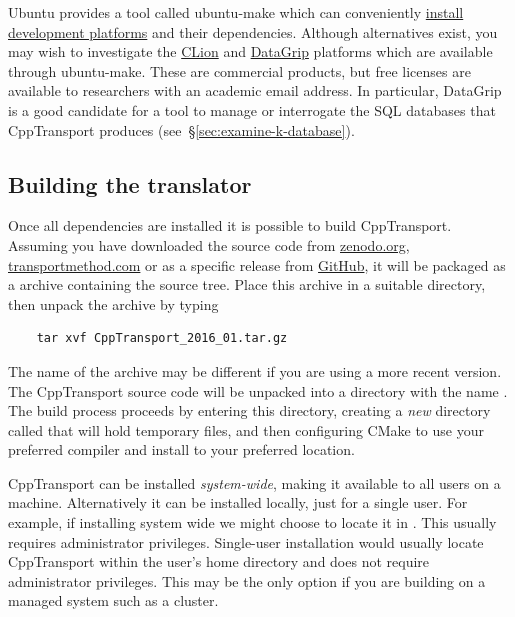 \documentclass[11pt,a4paper]{article}
\renewcommand{\texttt}[1]{{\ttfamily\fontseries{l}\selectfont{#1}}}
\newcommand{\packagefont}{\sffamily}
\newcommand{\CppTransport}{{\packagefont CppTransport}}
\newcommand{\CLion}{{\packagefont CLion}}
\newcommand{\DataGrip}{{\packagefont DataGrip}}
\newcommand{\CMake}{{\packagefont CMake}}
\newcommand{\file}[1]{\texttt{{#1}}}
\begin{document}
Ubuntu provides a tool called ubuntu-make which can conveniently
\href{https://wiki.ubuntu.com/ubuntu-make}{install
development platforms} and their dependencies.
Although alternatives exist, you may wish to investigate the
\href{https://www.jetbrains.com/clion/}{\CLion}
and
\href{https://www.jetbrains.com/datagrip/}{\DataGrip}
platforms which are available through ubuntu-make.
These are commercial products, but free licenses are available
to researchers with an academic email address.
In particular, {\DataGrip} is a good candidate
for a tool to manage or interrogate the SQL databases that
{\CppTransport} produces (see~\S\ref{sec:examine-k-database}).

\subsection{Building the translator}
\label{sec:build-translator}

Once all dependencies are installed it is possible to build {\CppTransport}.
Assuming you have downloaded the source code
from \href{http://zenodo.org}{zenodo.org},
\href{http://transportmethod.com}{transportmethod.com}
or as a specific release from
\href{https://github.com/ds283/CppTransport}{GitHub},
it will be packaged as a \file{.tar.gz} archive containing the source tree.
Place this archive in a suitable directory, then unpack the
archive by typing
\begin{verbatim}
	tar xvf CppTransport_2016_01.tar.gz
\end{verbatim}
The name of the archive may be different if you are using a more recent
version.
The {\CppTransport} source code will be unpacked into a directory
with the name \file{CppTransport}.
The build process proceeds by entering this directory,
creating a \emph{new} directory called
\file{build} that will hold temporary files,
and then configuring {\CMake} to use your preferred compiler
and install to your preferred location.

{\CppTransport} can be installed \emph{system-wide}, making it available
to all users on a machine. Alternatively it can be installed locally,
just for a single user. For example, if installing
system wide we might choose to locate it in \file{/usr/local}.
This usually requires administrator privileges.
Single-user installation would usually locate {\CppTransport} within the
user's home directory
and does not require administrator privileges. This may be the only option
if you are building on a managed system such as a cluster.
\end{document}
